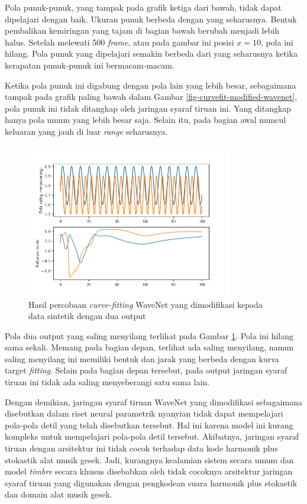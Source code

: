Pola punuk-punuk, yang tampak pada grafik ketiga dari bawah, tidak dapat dipelajari dengan baik. Ukuran punuk berbeda dengan yang seharusnya. Bentuk pembalikan kemiringan yang tajam di bagian bawah berubah menjadi lebih halus. Setelah melewati 500 \textit{frame}, atau pada gambar ini posisi $x=10$, pola ini hilang. Pola punuk yang dipelajari semakin berbeda dari yang seharusnya ketika kerapatan punuk-punuk ini bermacam-macam.

Ketika pola punuk ini digabung dengan pola lain yang lebih besar, sebagaimana tampak pada grafik paling bawah dalam Gambar \ref{fig-curvefit-modified-wavenet}, pola punuk ini tidak ditangkap oleh jaringan syaraf tiruan ini. Yang ditangkap hanya pola umum yang lebih besar saja. Selain itu, pada bagian awal muncul keluaran yang jauh di luar \textit{range} seharusnya.

\begin{figure}[htbp]
    \centering
    \includegraphics[width=0.8\textwidth]{resources/analisis_modified_wavenet_two_outputs.png}
    \caption{Hasil percobaan \textit{curve-fitting} WaveNet yang dimodifikasi kepada data sintetik dengan dua output}\label{fig-curvefit-modified-wavenet-two-outputs}
\end{figure}

Pola dua output yang saling menyilang terlihat pada Gambar \ref{fig-curvefit-modified-wavenet-two-outputs}. Pola ini hilang sama sekali. Memang pada bagian depan, terlihat ada saling menyilang, namun saling menyilang ini memiliki bentuk dan jarak yang berbeda dengan kurva target \textit{fitting}. Selain pada bagian depan tersebut, pada output jaringan syaraf tiruan ini tidak ada saling menyeberangi satu sama lain.

Dengan demikian, jaringan syaraf tiruan WaveNet yang dimodifikasi sebagaimana disebutkan dalam riset neural parametrik nyanyian tidak dapat mempelajari pola-pola detil yang telah disebutkan tersebut. Hal ini karena model ini kurang kompleks untuk mempelajari pola-pola detil tersebut. Akibatnya, jaringan syaraf tiruan dengan arsitektur ini tidak cocok terhadap data kode harmonik plus stokastik alat musik gesek. Jadi, kurangnya kealamian sistem secara umum dan model \textit{timbre} secara khusus disebabkan oleh tidak cocoknya arsitektur jaringan syaraf tiruan yang digunakan dengan pengkodean suara harmonik plus stokastik dan domain alat musik gesek.

